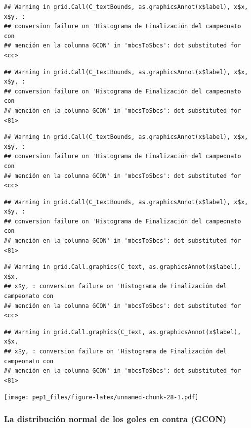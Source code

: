\documentclass[]{article}
\begin{document}
\begin{verbatim}
## Warning in grid.Call(C_textBounds, as.graphicsAnnot(x$label), x$x, x$y, :
## conversion failure on 'Histograma de Finalización del campeonato con
## mención en la columna GCON' in 'mbcsToSbcs': dot substituted for <cc>
\end{verbatim}

\begin{verbatim}
## Warning in grid.Call(C_textBounds, as.graphicsAnnot(x$label), x$x, x$y, :
## conversion failure on 'Histograma de Finalización del campeonato con
## mención en la columna GCON' in 'mbcsToSbcs': dot substituted for <81>
\end{verbatim}

\begin{verbatim}
## Warning in grid.Call(C_textBounds, as.graphicsAnnot(x$label), x$x, x$y, :
## conversion failure on 'Histograma de Finalización del campeonato con
## mención en la columna GCON' in 'mbcsToSbcs': dot substituted for <cc>
\end{verbatim}

\begin{verbatim}
## Warning in grid.Call(C_textBounds, as.graphicsAnnot(x$label), x$x, x$y, :
## conversion failure on 'Histograma de Finalización del campeonato con
## mención en la columna GCON' in 'mbcsToSbcs': dot substituted for <81>
\end{verbatim}

\begin{verbatim}
## Warning in grid.Call.graphics(C_text, as.graphicsAnnot(x$label), x$x,
## x$y, : conversion failure on 'Histograma de Finalización del campeonato con
## mención en la columna GCON' in 'mbcsToSbcs': dot substituted for <cc>
\end{verbatim}

\begin{verbatim}
## Warning in grid.Call.graphics(C_text, as.graphicsAnnot(x$label), x$x,
## x$y, : conversion failure on 'Histograma de Finalización del campeonato con
## mención en la columna GCON' in 'mbcsToSbcs': dot substituted for <81>
\end{verbatim}

\texttt{[image: pep1\_files/figure-latex/unnamed-chunk-28-1.pdf]}

\hypertarget{la-distribucion-normal-de-los-goles-en-contra-gcon}{%
\subsubsection{La distribución normal de los goles en contra
(GCON)}\label{la-distribucion-normal-de-los-goles-en-contra-gcon}}
\end{document}
